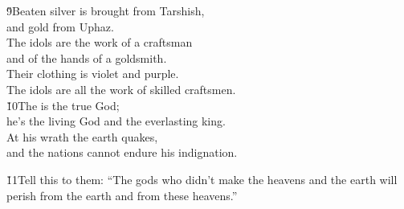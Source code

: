 \begin{poetry}
\poeml \v{9}Beaten silver is brought from Tarshish, \\
\poemll    and gold from Uphaz. \\
\poeml The idols are the work of a craftsman \\
\poemll    and of the hands of a goldsmith. \\
\poeml Their clothing is violet and purple. \\
\poemll    The idols are all the work of skilled craftsmen. \\
\poeml \v{10}The  is the true God; \\
\poemll    he's the living God and the everlasting king. \\
\poeml At his wrath the earth quakes, \\
\poemll    and the nations cannot endure his indignation.
\end{poetry}

\v{11}Tell this to them: ``The gods who didn't make the heavens and the earth will perish from the earth and from these heavens.''

